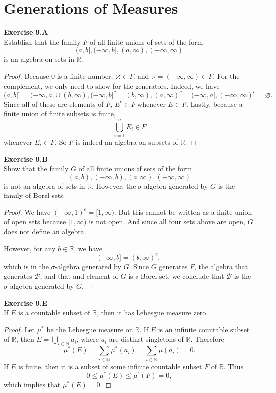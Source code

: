 \documentclass[12pt, a4paper]{article}
\theoremstyle{plain}
\newcommand{\N}{\mathbb{N}}
\newcommand{\B}{\mathscr{B}}
\newcommand{\R}{\mathbb{R}}
\newenvironment{exercise}[2][Exercise]
    { \begin{mdframed}[backgroundcolor=gray!20] \textbf{#1 #2} \\}
    {  \end{mdframed}}
\begin{document}
\pagebreak

\section{Generations of Measures}


\begin{exercise}{9.A}
    Establish that the family $F$ of all finite unions of sets of the form 
    \[
    (a,b],(-\infty,b],(a,\infty),(-\infty,\infty)
    \]
    is an algebra on sets in $\R$.
\end{exercise}
    \begin{proof}
        Because $0$ is a finite number, $\varnothing\in F$, and $\R = (-\infty,\infty)\in F$. For the complement, we only need to show for the generators. Indeed, we have
        \[
        (a,b]^c = (-\infty,a]\cup (b,\infty), (-\infty,b]^c = (b,\infty),(a,\infty)^c=(-\infty,a], (-\infty,\infty)^c = \varnothing.
        \]
        Since all of these are elements of $F$, $E^c\in F$ whenever $E\in F$. Lastly, because a finite union of finite subsets is finite, 
        \[
        \bigcup_{i=1}^n E_i\in F
        \]
        whenever $E_i\in F$. So $F$ is indeed an algebra on subsets of $\R$.
    \end{proof}

\begin{exercise}{9.B}
    Show that the family $G$ of all finite unions of sets of the form 
    \[
    (a,b),(-\infty,b),(a,\infty),(-\infty,\infty)
    \]
    is not an algebra of sets in $\R$. However, the $\sigma$-algebra generated by $G$ is the family of Borel sets.
\end{exercise}
    \begin{proof}
        We have $(-\infty,1)^c=[1,\infty)$. But this cannot be written as a finite union of open sets because $[1,\infty)$ is not open. And since all four sets above are open, $G$ does not define an algebra.

        However, for any $b\in \R$, we have
        \[
        (-\infty,b] = (b,\infty)^c,
        \]
        which is in the $\sigma$-algebra generated by $G$. Since $G$ generates $F$, the algebra that generates $\B$, and that and element of $G$ is a Borel set, we conclude that $\B$ is the $\sigma$-algebra generated by $G$.
    \end{proof}

\pagebreak

\begin{exercise}{9.E}
    If $E$ is a countable subset of $\R$, then it has Lebesgue measure zero.
\end{exercise}
    \begin{proof}
        Let $\mu^*$ be the Lebesgue measure on $\R$. If $E$ is an infinite countable subset of $\R$, then $E = \bigcup_{i\in\N}a_i$, where $a_i$ are distinct singletons of $\R$. Therefore
        \[
        \mu^*(E) = \sum_{i\in\N}\mu^*(a_i) = \sum_{i\in\N}\mu(a_i) = 0.
        \]
        If $E$ is finite, then it is a subset of some infinite countable subset $F$ of $\R$. Thus
        \[
        0\leq \mu^*(E)\leq \mu^*(F) = 0,
        \]
        which implies that $\mu^*(E)=0$.
    \end{proof}
\end{document}
